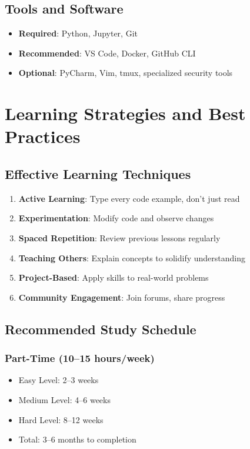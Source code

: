 \documentclass[11pt,letterpaper]{article}
\begin{document}
\subsection{Tools and Software}
\begin{itemize}[leftmargin=*]
    \item \textbf{Required}: Python, Jupyter, Git
    \item \textbf{Recommended}: VS Code, Docker, GitHub CLI
    \item \textbf{Optional}: PyCharm, Vim, tmux, specialized security tools
\end{itemize}

\section{Learning Strategies and Best Practices}

\subsection{Effective Learning Techniques}
\begin{enumerate}[leftmargin=*]
    \item \textbf{Active Learning}: Type every code example, don't just read
    \item \textbf{Experimentation}: Modify code and observe changes
    \item \textbf{Spaced Repetition}: Review previous lessons regularly
    \item \textbf{Teaching Others}: Explain concepts to solidify understanding
    \item \textbf{Project-Based}: Apply skills to real-world problems
    \item \textbf{Community Engagement}: Join forums, share progress
\end{enumerate}

\subsection{Recommended Study Schedule}

\subsubsection{Part-Time (10--15 hours/week)}
\begin{itemize}[leftmargin=*]
    \item Easy Level: 2--3 weeks
    \item Medium Level: 4--6 weeks
    \item Hard Level: 8--12 weeks
    \item Total: 3--6 months to completion
\end{itemize}
\end{document}
